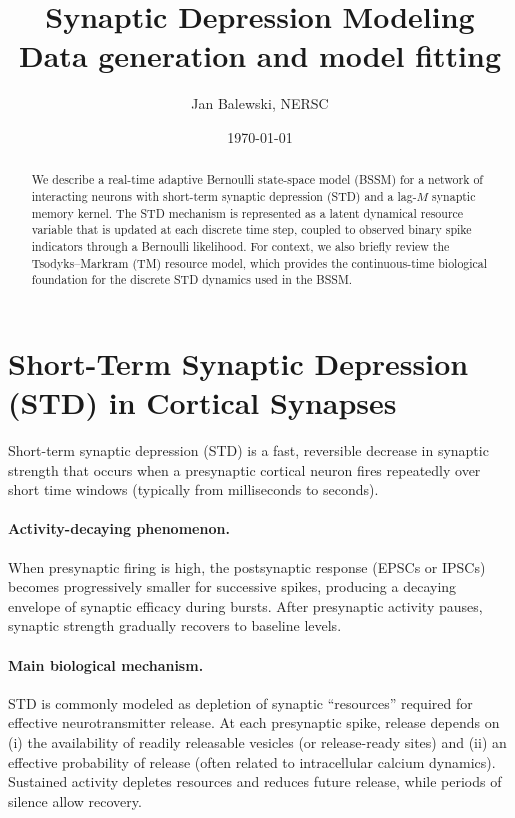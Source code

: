 \documentclass[11pt]{article}
\title{Synaptic Depression Modeling \\ Data generation and model fitting}
\author{Jan Balewski, NERSC}
\date{\today}
\begin{document}
\maketitle

\begin{abstract}
We describe a real-time adaptive Bernoulli state-space model (BSSM) for a network of
interacting neurons with short-term synaptic depression (STD) and a lag-$M$ synaptic
memory kernel. The STD mechanism is represented as a latent dynamical resource variable
that is updated at each discrete time step, coupled to observed binary spike indicators
through a Bernoulli likelihood. For context, we also briefly review the Tsodyks--Markram
(TM) resource model, which provides the continuous-time biological foundation for the
discrete STD dynamics used in the BSSM.
\end{abstract}

\section{Short-Term Synaptic Depression (STD) in Cortical Synapses}
\label{sec:std_intro}

Short-term synaptic depression (STD) is a fast, reversible decrease in synaptic strength
that occurs when a presynaptic cortical neuron fires repeatedly over short time windows
(typically from milliseconds to seconds).

\paragraph{Activity-decaying phenomenon.}
When presynaptic firing is high, the postsynaptic response (EPSCs or IPSCs) becomes
progressively smaller for successive spikes, producing a decaying envelope of synaptic
efficacy during bursts. After presynaptic activity pauses, synaptic strength gradually
recovers to baseline levels.

\paragraph{Main biological mechanism.}
STD is commonly modeled as depletion of synaptic ``resources'' required for effective
neurotransmitter release. At each presynaptic spike, release depends on
(i) the availability of readily releasable vesicles (or release-ready sites) and
(ii) an effective probability of release (often related to intracellular calcium dynamics).
Sustained activity depletes resources and reduces future release, while periods of silence
allow recovery.
\end{document}

